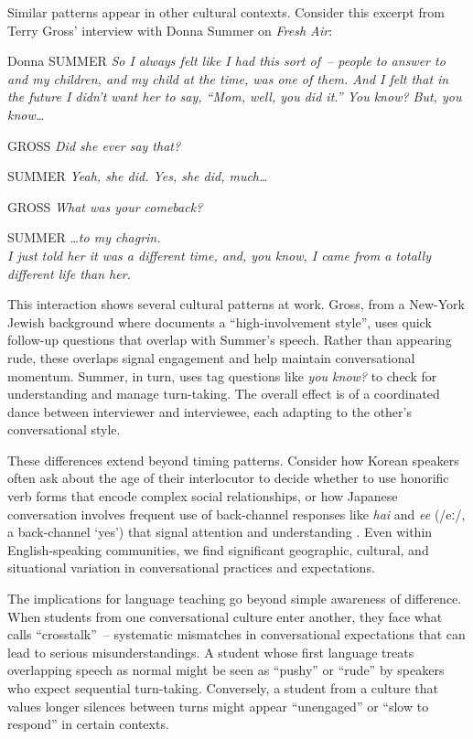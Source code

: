 Similar patterns appear in other cultural contexts. Consider this excerpt from Terry Gross' interview with Donna Summer on \textit{Fresh Air}:

\ea
\begin{dialogue}
\item[Donna SUMMER] \textit{So I always felt like I had this sort of~-- people to answer to and my children, and my child at the time, was one of them. And I felt that in the future I didn't want her to say, ``Mom, well, you did it.'' You know? But, you know\dots} 
\item[GROSS] \hspace{2.7cm}\textit{Did she ever say that?} 
\item[SUMMER] \textit{Yeah, she did. Yes, she did, much\dots}
\item[GROSS] \hspace{2cm}\textit{What was your comeback?} 
\item[SUMMER] \hspace{5cm}\dots\textit{to my chagrin.\\I just told her it was a different time, and, you know, I came from a totally different life than her.}
\end{dialogue}
\z
This interaction shows several cultural patterns at work. Gross, from a New-York Jewish background where \citet{tannen1984} documents a ``high-involvement style'', uses quick follow-up questions that overlap with Summer's speech. Rather than appearing rude, these overlaps signal engagement and help maintain conversational momentum. Summer, in turn, uses tag questions like \textit{you know?} to check for understanding and manage turn-taking. The overall effect is of a coordinated dance between interviewer and interviewee, each adapting to the other's conversational style.

These differences extend beyond timing patterns. Consider how Korean speakers often ask about the age of their interlocutor to decide whether to use honorific verb forms that encode complex social relationships, or how Japanese conversation involves frequent use of back-channel responses like \textit{hai} and \textit{ee} (/eː/, a back-channel `yes') that signal attention and understanding \citep{maynard1986}. Even within English-speaking communities, we find significant geographic, cultural, and situational variation in conversational practices and expectations.

The implications for language teaching go beyond simple awareness of difference. When students from one conversational culture enter another, they face what \citet{gumperz1982} calls ``crosstalk''~-- systematic mismatches in conversational expectations that can lead to serious misunderstandings. A student whose first language treats overlapping speech as normal might be seen as ``pushy'' or ``rude'' by speakers who expect sequential turn-taking. Conversely, a student from a culture that values longer silences between turns might appear ``unengaged'' or ``slow to respond'' in certain contexts.

